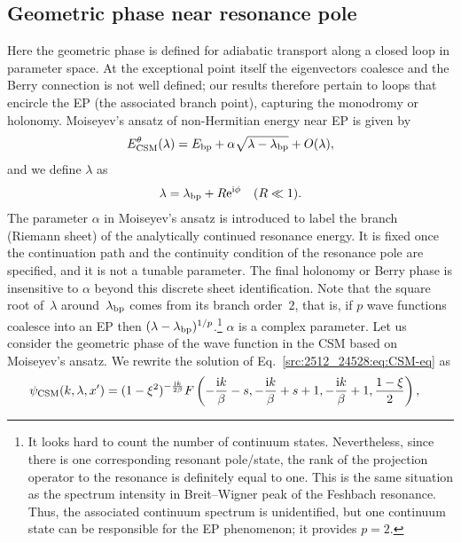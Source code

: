 \subsection{Geometric phase near resonance pole}
Here the geometric phase is defined for adiabatic transport along a closed loop in parameter space. At the exceptional point itself the eigenvectors coalesce and the Berry connection is not well defined; our results therefore pertain to loops that encircle the EP (the associated branch point), capturing the monodromy or holonomy.
Moiseyev's ansatz of non-Hermitian energy near EP \cite{Moiseyev2011NHQM} is given by
\begin{align}
    E_{\mathrm{CSM}}^\theta(\lambda) = E_{\mathrm{bp}} + \alpha \sqrt{\lambda - \lambda_{\mathrm{bp}}} + O(\lambda),
    \label{src:2512_24528:eq:moiseyev}
\end{align}
and we define $\lambda$ as
\begin{align}
    \lambda = \lambda_{\mathrm{bp}} + R \mathrm{e}^{\mathrm{i} \phi} 
    \quad(R\ll1).
\end{align}
The parameter $\alpha$ in Moiseyev's ansatz is introduced to label the branch (Riemann sheet) of the analytically continued resonance energy. It is fixed once the continuation path and the continuity condition of the resonance pole are specified, and it is not a tunable parameter. The final holonomy or Berry phase is insensitive to $\alpha$ beyond this discrete sheet identification.
Note that the square root of~$\lambda$ around~$\lambda_{\mathrm{bp}}$ comes from its branch order~$2$, that is, if $p$ wave functions coalesce into an EP then $(\lambda-\lambda_{\mathrm{bp}})^{1/p}$.\footnote{It looks hard to count the number of continuum states. Nevertheless, since there is one corresponding resonant pole/state, the rank of the projection operator to the resonance is definitely equal to one. This is the same situation as the spectrum intensity in Breit--Wigner peak of the Feshbach resonance. Thus, the associated continuum spectrum is unidentified, but one continuum state can be responsible for the EP phenomenon; it provides $p=2$.} $\alpha$ is a complex parameter.
Let us consider the geometric phase of the wave function in the CSM based on Moiseyev's ansatz. We rewrite the solution of Eq.~\eqref{src:2512_24528:eq:CSM-eq} as 
\begin{align}
    &\psi_{\mathrm{CSM}}(k,\lambda,x')= (1-\xi^2)^{-\frac{\mathrm{i} k}{2\beta}} 
    F\left( -\frac{\mathrm{i} k}{\beta}-s, -\frac{\mathrm{i} k}{\beta}+s+1, -\frac{\mathrm{i} k}{\beta}+1, \frac{1-\xi}{2} \right),
    \label{src:2512_24528:eq:CSM-sol}
\end{align}
